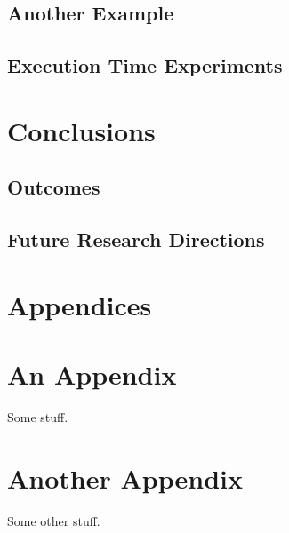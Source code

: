 \documentclass[11pt,twoside]{article}
\numberwithin{Theorem}{section}
\numberwithin{Definition}{section}
\numberwithin{Lemma}{section}
\numberwithin{Algorithm}{section}
\numberwithin{equation}{section}
\begin{document}
\subsection{Another Example}

\subsection{Execution Time Experiments}

\section{Conclusions}

\subsection{Outcomes}

\subsection{Future Research Directions}
\clearpage

\printbibliography
\clearpage

\appendix
\section*{Appendices}

\clearpage
\section{An Appendix}
\label{app:one}

Some stuff.
\clearpage

\section{Another Appendix}
\label{app:two}

Some other stuff.
\end{document}

